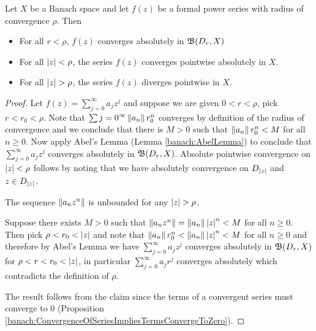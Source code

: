 \begin{prop} \label{banach:PowerSeriesConvergence}Let $X$ be a Banach space and let $f(z)$ be a formal
   power series with radius of convergence $\rho$.   Then
   \begin{itemize}
     \item[(i)] For all $r < \rho$, $f(z)$ converges absolutely in
       $\mathfrak{B}(D_r, X)$
     \item[(ii)] For all $\left \vert z \right \vert < \rho$, the series $f(z)$ converges pointwise
       absolutely in $X$.
     \item[(iii)] For all $\left \vert z \right \vert > \rho$, the series $f(z)$ diverges pointwise
       in $X$.
   \end{itemize}
\end{prop}
\begin{proof}
Let $f(z) = \sum_{j=0}^\infty a_j z^j$ and suppose we are given $0 < r <
\rho$, pick $r < r_0 < \rho$. Note that
$\sum{j=0}^\infty \left \lVert a_n \right \rVert r_0^n$ converges by definition of the
radius of convergence and we conclude that there is $M>0$ such that
$\left \lVert a_n \right \rVert r_0^n < M$ for all $n \geq 0$.  Now apply Abel's Lemma
(Lemma \ref{banach:AbelLemma}) to conclude that $\sum_{j=0}^\infty
a_j z^j$ converges absolutely in $\mathfrak{B}(D_r, X)$.
Absolute pointwise convergence on $\left \vert z \right \vert < \rho$ follows by noting
that we have absolutely convergence on $D_{\left \vert z \right \vert}$ and $z \in
D_{\left \vert z \right \vert}$.

\begin{clm}The sequence $\left \lVert a_n z^n \right \rVert$  is unbounded for any $\left \vert z \right \vert > \rho$.
\end{clm}
Suppose there exists $M > 0$
such that $\left \lVert a_n z^n \right \rVert = \left \lVert a_n \right \rVert \left \vert z \right \vert^n < M$ for all $n \geq
0$.   Then pick $\rho < r_0 < \left \vert z \right \vert$ and note that $\left \lVert a_n \right \rVert
r_0^n < \left \lVert a_n \right \rVert \left \vert z \right \vert^n < M$ for all $n\geq 0$ and therefore by
Abel's Lemma we have $\sum_{j=0}^\infty a_j z^j$ converges absolutely
in $\mathfrak{B}(D_r, X)$ for $\rho < r < r_0 < \left \vert z \right \vert$, in
particular  $\sum_{j=0}^\infty a_j r^j$ converges absolutely which 
contradicts the definition of $\rho$.

The result follows from the claim since the terms of a convergent series must
converge to 0 (Proposition \ref{banach:ConvergenceOfSeriesImpliesTermsConvergeToZero}).
\end{proof}

